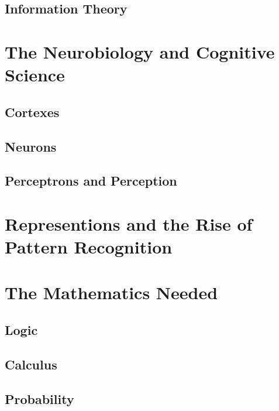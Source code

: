 \documentclass[]{book}
\theoremstyle{definition}
\theoremstyle{definition}
\theoremstyle{definition}
\theoremstyle{remark}
\begin{document}
\subsection{Information Theory}\label{information-theory}

\section{The Neurobiology and Cognitive
Science}\label{the-neurobiology-and-cognitive-science}

\subsection{Cortexes}\label{cortexes}

\subsection{Neurons}\label{neurons}

\subsection{Perceptrons and
Perception}\label{perceptrons-and-perception}

\section{Representions and the Rise of Pattern
Recognition}\label{representions-and-the-rise-of-pattern-recognition}

\section{The Mathematics Needed}\label{the-mathematics-needed}

\subsection{Logic}\label{logic}

\subsection{Calculus}\label{calculus}

\subsection{Probability}\label{probability-1}
\end{document}
